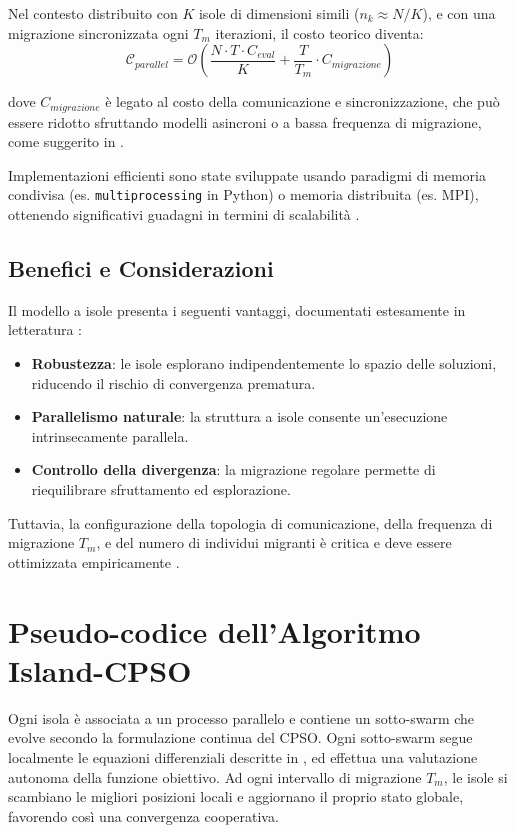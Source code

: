 \documentclass{article}
\begin{document}
Nel contesto distribuito con $K$ isole di dimensioni simili ($n_k \approx N/K$), e con una migrazione 
sincronizzata ogni $T_m$ iterazioni, il costo teorico diventa:
\begin{equation}
\mathcal{C}_{parallel} = \mathcal{O}\left(\frac{N \cdot T \cdot C_{eval}}{K} + \frac{T}{T_m} \cdot C_{migrazione}\right)
\end{equation}

dove $C_{migrazione}$ è legato al costo della comunicazione e sincronizzazione, che può essere ridotto 
sfruttando modelli asincroni o a bassa frequenza di migrazione, come suggerito in \cite{cantupaz1998survey}.

Implementazioni efficienti sono state sviluppate usando paradigmi di memoria condivisa 
(es. \texttt{multiprocessing} in Python) o memoria distribuita (es. MPI), ottenendo significativi guadagni in 
termini di scalabilità \cite{alba2002parallelism, li2019openbox}.

\subsection{Benefici e Considerazioni}

Il modello a isole presenta i seguenti vantaggi, documentati estesamente in letteratura \cite{cantupaz1998survey, tomassini2005spatially}:

\begin{itemize}
    \item \textbf{Robustezza}: le isole esplorano indipendentemente lo spazio delle soluzioni, riducendo il rischio di convergenza prematura.
    \item \textbf{Parallelismo naturale}: la struttura a isole consente un'esecuzione intrinsecamente parallela.
    \item \textbf{Controllo della divergenza}: la migrazione regolare permette di riequilibrare sfruttamento ed esplorazione.
\end{itemize}

Tuttavia, la configurazione della topologia di comunicazione, della frequenza di migrazione $T_m$, e del 
numero di individui migranti è critica e deve essere ottimizzata empiricamente \cite{alba2002parallelism}.

\section{Pseudo-codice dell'Algoritmo Island-CPSO}

Ogni isola è associata a un processo parallelo e contiene un sotto-swarm che evolve secondo la 
formulazione continua del CPSO. Ogni sotto-swarm segue localmente le equazioni differenziali descritte 
in \cite{Ricciardello2020}, ed effettua una valutazione autonoma della funzione obiettivo. Ad ogni 
intervallo di migrazione $T_m$, le isole si scambiano le migliori posizioni locali e aggiornano il 
proprio stato globale, favorendo così una convergenza cooperativa.
\end{document}
